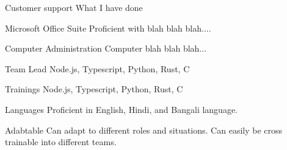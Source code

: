 

\begin{cvskills}

  \cvskill
    {Customer support} %
    {What I have done} %

  \cvskill
    {Microsoft Office Suite} %
    {Proficient with blah blah blah.... } %

  \cvskill
    {Computer Administration} %
    {Computer blah blah blah... } %

  \cvskill
    {Team Lead} %
    {Node.js, Typescript, Python, Rust, C} %
    
  \cvskill
	{Trainings} %
	{Node.js, Typescript, Python, Rust, C} %
	
  \cvskill
	{Languages} %
	{Proficient in English, Hindi, and Bangali language.} %
	
  \cvskill
	{Adabtable} %
	{Can adapt to different roles and situations. Can easily be cross trainable into different teams.} %

\end{cvskills}
